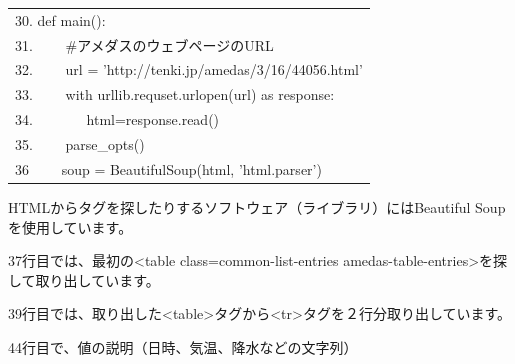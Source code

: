 


\begin{table}[htbp]
    \centering
    \begin{tabular}{|l|}
        \hline
        
        30. def main():\\
        31. \ \ \ \ \#アメダスのウェブページのURL\\
        32. \ \ \ \ url = 'http://tenki.jp/amedas/3/16/44056.html'\\
        33. \ \ \ \ with urllib.requset.urlopen(url) as response:\\
        34. \ \ \ \ \ \ \ html=response.read()\\
        35. \ \ \ \ parse\_opts()\\
        36 \ \ \ \ soup = BeautifulSoup(html, 'html.parser')\\
        
        \hline
    \end{tabular}
\end{table}


HTMLからタグを探したりするソフトウェア（ライブラリ）にはBeautiful
Soupを使用しています。

37行目では、最初の{\textless}table class={\textquotedbl}common-list-entries
amedas-table-entries{\textquotedbl}{\textgreater}を探して取り出しています。

39行目では、取り出した{\textless}table{\textgreater}タグから{\textless}tr{\textgreater}タグを２行分取り出しています。

44行目で、値の説明（日時、気温、降水などの文字列）

